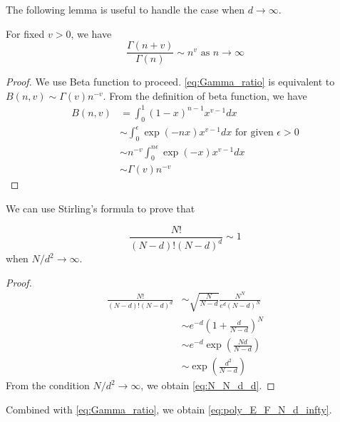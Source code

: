 \documentclass{aptpub}
\begin{document}
The following lemma is useful to handle the case when $d\to \infty$.
\begin{lemma}\label{lem:Gamma_ratio}
     For fixed $v>0$, we have
     \begin{equation}\label{eq:Gamma_ratio}
         \frac{\Gamma(n+v)}{\Gamma(n)} \sim
         n^v
         \textrm{ as } n \to \infty             
     \end{equation}
 \end{lemma}
 \begin{proof}
     We use Beta function to proceed.
     \eqref{eq:Gamma_ratio} is equivalent to
     $B(n, v) \sim \Gamma(v) n^{-v}$.
     From the definition of beta function,
     we have
     \begin{align*}
         B(n,v) &=\int_0^1 (1-x)^{n-1} x^{v-1} dx \\
         &\sim \int_0^{\epsilon} \exp(-nx) x^{v-1}dx \textrm{ for given } \epsilon>0\\
         & \sim n^{-v} \int_0^{n\epsilon} \exp(-x)x^{v-1}dx\\
         &\sim \Gamma(v) n^{-v}
     \end{align*}
 \end{proof}
We can use Stirling's formula to prove that
\begin{lemma}
\begin{equation}\label{eq:N_N_d_d}
     \frac{N!}{(N-d)! (N-d)^d} \sim 1
\end{equation}
when $N/d^2 \to \infty$.
\end{lemma}
\begin{proof}
     \begin{align*}
          \frac{N!}{(N-d)! (N-d)^d}
          &\sim \sqrt{\frac{N}{N-d}}\frac{N^N}{ e^d (N-d)^{N}}\\
          &\sim e^{-d} (1+\frac{d}{N-d})^{N} \\
          &\sim e^{-d} \exp(\frac{Nd}{N-d}) \\
          & \sim \exp(\frac{d^2}{N-d})
     \end{align*}
From the condition $N/d^2 \to \infty$,
we obtain \eqref{eq:N_N_d_d}.
\end{proof}
Combined with \eqref{eq:Gamma_ratio}, we obtain \eqref{eq:poly_E_F_N_d_infty}.
\end{document}
